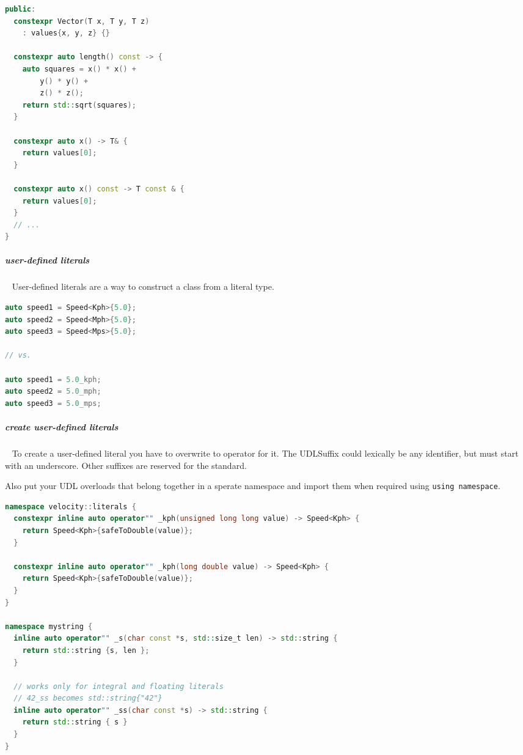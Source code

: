 \documentclass[11pt,twoside,landscape]{article}
\begin{document}
\begin{multicols}{2}
\begin{lstlisting}[language=c++,label=lst:org56ac3fd,caption={Example for a literal class type},captionpos=b,numbers=none]
public:
  constexpr Vector(T x, T y, T z)
    : values{x, y, z} {}

  constexpr auto length() const -> {
    auto squares = x() * x() +
        y() * y() +
        z() * z();
    return std::sqrt(squares);
  }

  constexpr auto x() -> T& {
    return values[0];
  }

  constexpr auto x() const -> T const & {
    return values[0];
  }
  // ...
}
\end{lstlisting}

\subparagraph{user-defined literals} \
\label{sec:orgd8f22b4}
User-defined literals are a way to construct a class from a literal type.

\begin{lstlisting}[language=c++,label=lst:org73fc0e5,caption={User-defined literals in action},captionpos=b,numbers=none]
auto speed1 = Speed<Kph>{5.0};
auto speed2 = Speed<Mph>{5.0};
auto speed3 = Speed<Mps>{5.0};

// vs.

auto speed1 = 5.0_kph;
auto speed2 = 5.0_mph;
auto speed3 = 5.0_mps;
\end{lstlisting}

\subparagraph{create user-defined literals} \
\label{sec:org4608d36}
To create a user-defined literal you have to overwrite to operator for it.
The UDLSuffix could lexically be any identifier, but must start with an underscore.
Other suffixes are reserved for the standard.

Also put your UDL overloads that belong together in a sperate namespace and import them when required using \texttt{using namespace}.

\begin{lstlisting}[language=c++,label=lst:orgfe11f1f,caption={user-defined literal for Speed},captionpos=b,numbers=none]
namespace velocity::literals {
  constexpr inline auto operator"" _kph(unsigned long long value) -> Speed<Kph> {
    return Speed<Kph>{safeToDouble(value)};
  }

  constexpr inline auto operator"" _kph(long double value) -> Speed<Kph> {
    return Speed<Kph>{safeToDouble(value)};
  }
}

namespace mystring {
  inline auto operator"" _s(char const *s, std::size_t len) -> std::string {
    return std::string {s, len };
  }

  // works only for integral and floating literals
  // 42_ss becomes std::string{"42"}
  inline auto operator"" _ss(char const *s) -> std::string {
    return std::string { s }
  }
}
\end{lstlisting}


\end{multicols}
\end{document}
